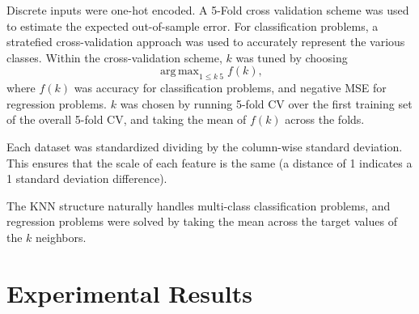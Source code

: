 \documentclass{amsart}
\DeclareMathOperator*{\argmax}{arg\,max}
\begin{document}
    Discrete inputs were one-hot encoded. A 5-Fold cross validation scheme was used to estimate the expected out-of-sample
    error. For classification problems, a stratefied cross-validation approach was used to accurately
    represent the various classes. Within the cross-validation scheme, $k$ was tuned by choosing
    \[
        \argmax_{1 \leq k \ 5} f(k),
    \]
    where $f(k)$ was accuracy for classification problems, and negative MSE for regression problems. $k$ was chosen
    by running 5-fold CV over the first training set of the overall 5-fold CV, and taking the mean of $f(k)$ across the
    folds.

    Each dataset was standardized dividing by the column-wise standard deviation. This
    ensures that the scale of each feature is the same (a distance of 1 indicates a 1
    standard deviation difference).

    The KNN structure naturally handles multi-class classification problems, and regression
    problems were solved by taking the mean across the target values of the $k$ neighbors.

    \section{Experimental Results}



\end{document}
